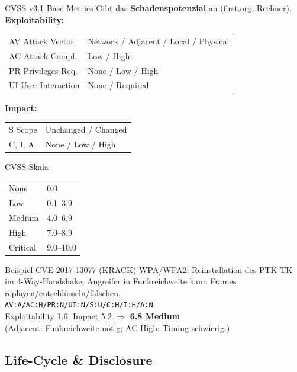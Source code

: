 \documentclass[a4paper, fontsize=7pt]{scrartcl}
\renewcommand*{\arraystretch}{1.5}  %
\begin{document}
\begin{mainbox}{CVSS v3.1 Base Metrics}
Gibt das \textbf{Schadenspotenzial} an (first.org, Rechner).\\
\textbf{Exploitability:}
\renewcommand*{\arraystretch}{1.2}
\begin{tabularx}{\linewidth}{@{}l|X@{}}
AV Attack Vector & Network / Adjacent / Local / Physical \\
AC Attack Compl. & Low / High \\
PR Privileges Req. & None / Low / High \\
UI User Interaction & None / Required \\
\end{tabularx}
\textbf{Impact:}
\begin{tabularx}{\linewidth}{@{}l|X@{}}
S Scope & Unchanged / Changed \\
C, I, A & None / Low / High \\
\end{tabularx}
\end{mainbox}

\begin{mainbox}{CVSS Skala}
\renewcommand*{\arraystretch}{1.2}
\begin{center}
\begin{tabular}{l|l}
None & 0.0 \\
Low & 0.1--3.9 \\
Medium & 4.0--6.9 \\
High & 7.0--8.9 \\
Critical & 9.0--10.0 \\
\end{tabular}
\end{center}
\end{mainbox}

\begin{subbox}{Beispiel CVE-2017-13077 (KRACK)}
WPA/WPA2: Reinstallation des PTK-TK im 4-Way-Handshake; Angreifer in
Funkreichweite kann Frames replayen/entschlüsseln/fälschen.\\
\texttt{AV:A/AC:H/PR:N/UI:N/S:U/C:H/I:H/A:N}\\
Exploitability 1.6, Impact 5.2 $\Rightarrow$ \textbf{6.8 Medium}\\
(Adjacent: Funkreichweite nötig; AC High: Timing schwierig.)
\end{subbox}

\subsection{Life-Cycle \& Disclosure}
\end{document}
